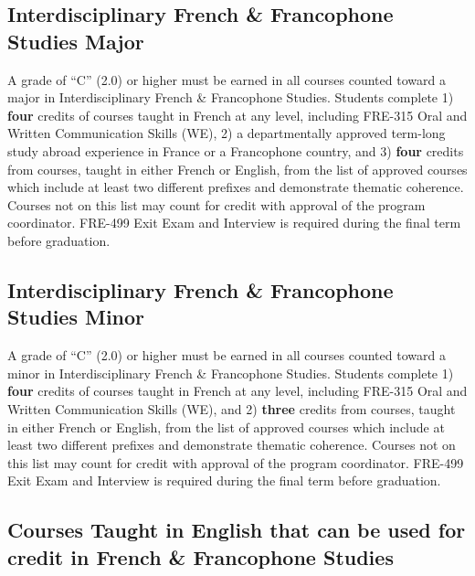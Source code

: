 \documentclass[
  letterpaper,
]{scrbook}
\begin{document}
\hypertarget{interdisciplinary-french-francophone-studies-major}{%
\subsection{Interdisciplinary French \& Francophone Studies
Major}\label{interdisciplinary-french-francophone-studies-major}}

A grade of ``C'' (2.0) or higher must be earned in all courses counted
toward a major in Interdisciplinary French \& Francophone Studies.
Students complete 1) \textbf{four} credits of courses taught in French
at any level, including FRE-315 Oral and Written Communication Skills
(WE), 2) a departmentally approved term-long study abroad experience in
France or a Francophone country, and 3) \textbf{four} credits from
courses, taught in either French or English, from the list of approved
courses which include at least two different prefixes and demonstrate
thematic coherence. Courses not on this list may count for credit with
approval of the program coordinator. FRE-499 Exit Exam and Interview is
required during the final term before graduation.

\hypertarget{interdisciplinary-french-francophone-studies-minor}{%
\subsection{Interdisciplinary French \& Francophone Studies
Minor}\label{interdisciplinary-french-francophone-studies-minor}}

A grade of ``C'' (2.0) or higher must be earned in all courses counted
toward a minor in Interdisciplinary French \& Francophone Studies.
Students complete 1) \textbf{four} credits of courses taught in French
at any level, including FRE-315 Oral and Written Communication Skills
(WE), and 2) \textbf{three} credits from courses, taught in either
French or English, from the list of approved courses which include at
least two different prefixes and demonstrate thematic coherence. Courses
not on this list may count for credit with approval of the program
coordinator. FRE-499 Exit Exam and Interview is required during the
final term before graduation.

\hypertarget{courses-taught-in-english-that-can-be-used-for-credit-in-french-francophone-studies}{%
\subsection{Courses Taught in English that can be used for credit in
French \& Francophone
Studies}\label{courses-taught-in-english-that-can-be-used-for-credit-in-french-francophone-studies}}
\end{document}

